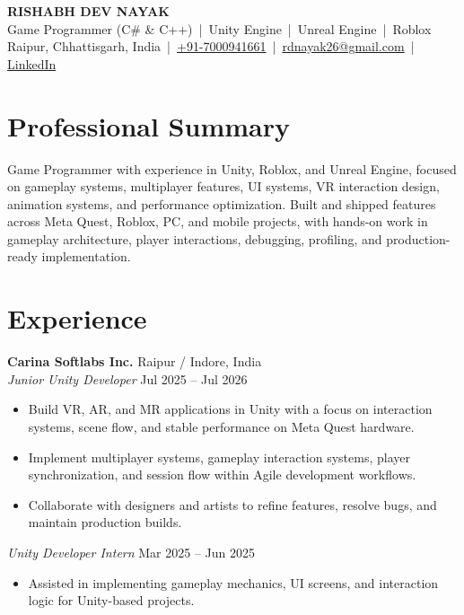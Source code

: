 \documentclass[a4paper,10pt]{article}
\begin{document}
{\Large \textbf{RISHABH DEV NAYAK}}\\[2pt]
Game Programmer (C\# \& C++) \,|\, Unity Engine \,|\, Unreal Engine \,|\, Roblox\\[1pt]
Raipur, Chhattisgarh, India \,|\, 
\href{tel:+917000941661}{+91-7000941661} \,|\, 
\href{mailto:rdnayak26@gmail.com}{rdnayak26@gmail.com} \,|\, 
\href{https://www.linkedin.com/in/rishabh-dev-nayak-0065a5201}{LinkedIn}

\section*{Professional Summary}
Game Programmer with experience in Unity, Roblox, and Unreal Engine, focused on gameplay systems, multiplayer features, UI systems, VR interaction design, animation systems, and performance optimization. Built and shipped features across Meta Quest, Roblox, PC, and mobile projects, with hands-on work in gameplay architecture, player interactions, debugging, profiling, and production-ready implementation.

\section*{Experience}
{\textbf{Carina Softlabs Inc.}} \hfill Raipur / Indore, India\\[1pt]
\textit{Junior Unity Developer} \hfill Jul 2025 -- Jul 2026
\begin{itemize}[leftmargin=15pt,itemsep=1pt,topsep=1pt,parsep=0pt,partopsep=0pt]
  \item Build VR, AR, and MR applications in Unity with a focus on interaction systems, scene flow, and stable performance on Meta Quest hardware.
  \item Implement multiplayer systems, gameplay interaction systems, player synchronization, and session flow within Agile development workflows.
  \item Collaborate with designers and artists to refine features, resolve bugs, and maintain production builds.
\end{itemize}
\vspace{1pt}

\textit{Unity Developer Intern} \hfill Mar 2025 -- Jun 2025
\begin{itemize}[leftmargin=15pt,itemsep=1pt,topsep=1pt,parsep=0pt,partopsep=0pt]
  \item Assisted in implementing gameplay mechanics, UI screens, and interaction logic for Unity-based projects.
\end{itemize}
\vspace{4pt}
\end{document}
